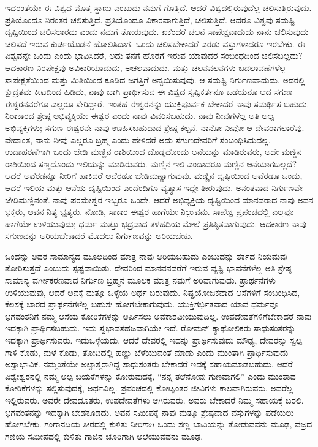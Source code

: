 ಇದರಂತೆಯೇ ಈ ವಿಶ್ವದ ಮೊತ್ತ ಸ್ಥಾಣು ಎಂಬುದು ನಮಗೆ ಗೊತ್ತಿದೆ. ಆದರೆ ವಿಶ್ವದಲ್ಲಿರುವುದೆಲ್ಲ ಚಲಿಸುತ್ತಿರುವುದು. ಪ್ರತಿಯೊಂದೂ ನಿರಂತರ ಚಲಿಸುತ್ತಿದೆ. ಪ್ರತಿಯೊಂದೂ ವಿಕಾರವಾಗುತ್ತಿದೆ, ಚಲಿಸುತ್ತಿದೆ. ಆದರೂ ವಿಶ್ವವು ಸಮಷ್ಟಿ ದೃಷ್ಟಿಯಿಂದ ಚಲಿಸಲಾರದು ಎಂದು ನಮಗೆ ತೋರುವುದು. ಏಕೆಂದರೆ ಚಲನೆ ಸಾಪೇಕ್ಷವಾದುದು  ನಾನು ಚಲಿಸುವುದು ಚಲಿಸದೆ ಇರುವ ಕುರ್ಚಿಯೊಡನೆ ಹೋಲಿಸಿದಾಗ. ಒಂದು ಚಲಿಸಬೇಕಾದರೆ ಎರಡು ವಸ್ತುಗಳಾದರೂ ಇರಬೇಕು. ಈ ವಿಶ್ವವನ್ನೇ ಒಂದು ಎಂದು ಭಾವಿಸಿದರೆ, ಅದು ತನಗೆ ಹೊರಗೆ ಇರುವ ಯಾವುದರ ಸಂಬಂಧದಿಂದ ಚಲಿಸಬಲ್ಲದು? ಆದಕಾರಣ ನಿರಪೇಕ್ಷವು ಅವಿಕಾರಿಯಾದುದು, ಅಚಲವಾದುದು. ಮತ್ತು ಚಲನವಲನಗಳು ಬದಲಾವಣೆಗಳೆಲ್ಲ ಸಾಪೇಕ್ಷತೆಯಿಂದ ಮತ್ತು ಮಿತಿಯಿಂದ ಕೂಡಿದ ಜಗತ್ತಿಗೆ ಅನ್ವಯಿಸುವುವು. ಆ ಸಮಷ್ಟಿ ನಿರ್ಗುಣವಾದುದು. ಅದರಲ್ಲಿ ಕ್ಷುದ್ರತಮ ಕೀಟದಿಂದ ಹಿಡಿದು, ನಾವು ಬಾಗಿ ಪ್ರಾರ್ಥಿಸುವ ಈ ವಿಶ್ವದ ಸೃಷ್ಟಿಕರ್ತನೂ ಒಡೆಯನೂ ಆದ ಸಗುಣ ಈಶ್ವರನವರೆಗೂ ಎಲ್ಲರೂ ಸೇರಿದ್ದಾರೆ. ಇಂತಹ ಈಶ್ವರನನ್ನು ಯುಕ್ತಿಪೂರ್ವಕ ಬೇಕಾದರೆ ನಾವು ಸಮರ್ಥಿಸ ಬಹುದು. ನಿರಾಕಾರದ ಶ್ರೇಷ್ಠ ಅಭಿವ್ಯಕ್ತಿಯೇ ಈಶ್ವರ ಎಂದು ನಾವು ವಿವರಿಸಬಹುದು. ನಾವು ನೀವುಗಳೆಲ್ಲ ಅತಿ ಅಲ್ಪ ಅಭಿವ್ಯಕ್ತಿಗಳು; ಸಗುಣ ಈಶ್ವರನೇ ನಾವು ಊಹಿಸಬಹುದಾದ ಶ್ರೇಷ್ಠ ಕಲ್ಪನೆ. ನಾನೋ ನೀವೋ ಆ ದೇವರಾಗಲಾರೆವು. ವೇದಾಂತ, ನಾನು ನೀವು ಎಲ್ಲರೂ ಬ್ರಹ್ಮ ಎಂದು ಹೇಳಿದರೆ ಅದು ಸಗುಣದೇವರಿಗೆ ಸಂಬಂಧಿಸಿದುದಲ್ಲ. ಉದಾಹರಣೆಗಾಗಿ ಒಂದು ಜೇಡಿ ಮಣ್ಣಿನ ರಾಶಿಯಿಂದ ದೊಡ್ಡದೊಂದು ಆನೆಯನ್ನು ಮಾಡಿರುವರು, ಅದೇ ಮಣ್ಣಿನ ರಾಶಿಯಿಂದ ಸಣ್ಣದೊಂದು ಇಲಿಯನ್ನು ಮಾಡಿರುವರು. ಮಣ್ಣಿನ ಇಲಿ ಎಂದಾದರೂ ಮಣ್ಣಿನ ಆನೆಯಾಗಬಲ್ಲದೆ? ಆದರೆ ಅವೆರಡನ್ನೂ ನೀರಿಗೆ ಹಾಕಿದರೆ ಅವೆರಡೂ ಜೇಡಿಮಣ್ಣಾಗುವುವು. ಮಣ್ಣಿನ ದೃಷ್ಟಿಯಿಂದ ಅವೆರಡೂ ಒಂದು, ಆದರೆ ಇಲಿಯ ಮತ್ತು ಆನೆಯ ದೃಷ್ಟಿಯಿಂದ ಎಂದೆಂದಿಗೂ ವ್ಯತ್ಯಾಸ ಇದ್ದೇ ತೀರುವುದು. ಅನಂತವಾದ ನಿರ್ಗುಣವೇ ಜೇಡಿಮಣ್ಣಿನಂತೆ. ನಾವು ಪರಮೇಶ್ವರ ಇಬ್ಬರೂ ಒಂದೇ. ಆದರೆ ಅಭಿವ್ಯಕ್ತಿಯ ದೃಷ್ಟಿಯಿಂದ ಮಾನವರಾದ ನಾವು ಅವನ ಭಕ್ತರು, ಅವನ ನಿತ್ಯ ಭೃತ್ಯರು. ನೋಡಿ, ಸಾಕಾರ ಈಶ್ವರ ಹಾಗೆಯೇ ನಿಲ್ಲುವನು. ಸಾಪೇಕ್ಷ ಪ್ರಪಂಚದಲ್ಲಿ ಎಲ್ಲವೂ ಹಾಗೆಯೇ ಉಳಿಯುವುದು; ಧರ್ಮ ಮತ್ತೂ ಭದ್ರವಾದ ತಳಹದಿಯ ಮೇಲೆ ಪ್ರತಿಷ್ಠಿತವಾಗುವುದು. ಆದಕಾರಣ ನಾವು ಸಗುಣವನ್ನು ಅರಿಯಬೇಕಾದರೆ ಮೊದಲು ನಿರ್ಗುಣವನ್ನು ಅರಿಯಬೇಕು.

ಒಂದನ್ನು  ಅದರ ಸಾಮಾನ್ಯದ  ಮೂಲದಿಂದ ಮಾತ್ರ ನಾವು ಅರಿಯಬಹುದು ಎಂಬುದನ್ನು ತರ್ಕದ ನಿಯಮವು ತೋರಿಸುತ್ತದೆ ಎಂಬುದು ಸ್ಪಷ್ಟವಾಯಿತು. ದೇವರಿಂದ ಮಾನವನವರೆಗೆ ಇರುವ ವ್ಯಷ್ಟಿ ಭಾವನೆಗಳೆಲ್ಲ ಅತಿ ಶ್ರೇಷ್ಠ ಸಾಮಾನ್ಯ ವರ್ಗೀಕರಣವಾದ ನಿರ್ಗುಣ ಬ್ರಹ್ಮನ ಮೂಲಕ ಮಾತ್ರ ನಮಗೆ ಅರಿವಾಗುವುದು. ಪ್ರಾರ್ಥನೆಗಳು ಉಳಿಯುವುವು, ಆದರೆ ಅವಕ್ಕೆ ಮತ್ತೂ ಒಳ್ಳೆಯ ಅರ್ಥ ಬರುವುದು. ನಿಷ್ಪ್ರಯೋಜಕವಾದ ಆಸೆಗಳಿಗೆ ಸಂಬಂಧಿಸಿದ, ಕೆಲಸಕ್ಕೆ ಬಾರದ ಪ್ರಾರ್ಥನೆಗಳೆಲ್ಲ ಬಹುಶಃ ಹೋಗಬೇಕಾಗುವುದು. ಯುಕ್ತಿಗರ್ಭಿತವಾದ ಯಾವ ಧರ್ಮವೂ ಭಗವಂತನಿಗೆ ನಮ್ಮ ಆಸೆಯ ಕೋರಿಕೆಗಳನ್ನು ಅರ್ಪಿಸಲು ಅವಕಾಶವೀಯುವುದಿಲ್ಲ. ಉಪದೇವತೆಗಳಿಗೆ\break ಬೇಕಾದರೆ ನಾವು ಇದಕ್ಕಾಗಿ ಪ್ರಾರ್ಥಿಸಬಹುದು. ಇದು ಸ್ವಭಾವಸಹಜವಾಗಿಯೇ ಇದೆ. ರೋಮನ್ ಕ್ಯಾಥೋಲಿಕರು ಸಾಧುಸಂತರನ್ನು ಇದಕ್ಕಾಗಿ ಪ್ರಾರ್ಥಿಸುವರು. ಇದು\break ಒಳ್ಳೆಯದು. ಆದರೆ ದೇವರಲ್ಲಿ ಇದನ್ನು ಪ್ರಾರ್ಥಿಸುವುದು ಮೌಢ್ಯ, ದೇವರನ್ನು ಸ್ವಲ್ಪ ಗಾಳಿ ಕೊಡು, ಮಳೆ ಕೊಡು, ತೋಟದಲ್ಲಿ ಹಣ್ಣು ಬೆಳೆಯುವಂತೆ ಮಾಡು ಎಂದು ಮುಂತಾಗಿ ಪ್ರಾರ್ಥಿಸುವುದು ಅಸ್ವಾಭಾವಿಕ. ನಮ್ಮಂತೆಯೇ ಅಲ್ಪಾತ್ಮರಾಗಿದ್ದ ಸಾಧುಸಂತರು ಬೇಕಾದರೆ ಇದಕ್ಕೆ ಸಹಾಯಮಾಡಬಹುದು. ಆದರೆ ವಿಶ್ವೇಶ್ವರನಲ್ಲಿ ನಮ್ಮ ಅಲ್ಪ ಬಯಕೆಗಳನ್ನು ಕೋರುವುದಕ್ಕೆ, “ನನ್ನ ತಲೆನೋವು ಗುಣವಾಗಲಿ'' ಎಂದು ಮುಂತಾದ ಕೋರಿಕೆಗಳನ್ನು ಸಲ್ಲಿಸುವುದಕ್ಕೆ, ಅರ್ಥವಿಲ್ಲ. ಪ್ರಪಂಚದಲ್ಲಿ ಕೋಟ್ಯಂತರ ಜೀವಿಗಳು ಕಾಲವಾಗಿರುವರು, ಅವರೆಲ್ಲ ಇಲ್ಲಿರುವರು. ಅವರೇ ದೇವದೂತರು, ಉಪದೇವತೆಗಳು ಆಗಿರುವರು. ಅವರು ಬೇಕಾದರೆ ನಿಮ್ಮ ಸಹಾಯಕ್ಕೆ ಬರಲಿ. ಭಗವಂತನನ್ನು ಇದಕ್ಕಾಗಿ ಬೇಡಕೂಡದು. ಅವನ ಸಮೀಪಕ್ಕೆ ನಾವು ಮತ್ತೂ ಶ್ರೇಷ್ಠವಾದ ವಸ್ತುಗಳನ್ನು ಪಡೆಯಲು ಹೋಗಬೇಕು. ಗಂಗಾನದಿಯ ತೀರದಲ್ಲಿ ಕುಳಿತು ನೀರಿಗಾಗಿ ಒಂದು ಸಣ್ಣ ಬಾವಿಯನ್ನು ತೋಡುವವನು ಮೂಢ, ವಜ್ರದ ಗಣಿಯ ಸಮೀಪದಲ್ಲಿ ಕುಳಿತು ಗಾಜಿನ ಚೂರಿಗಾಗಿ ಅಲೆಯುವವನು ಮೂಢ.

